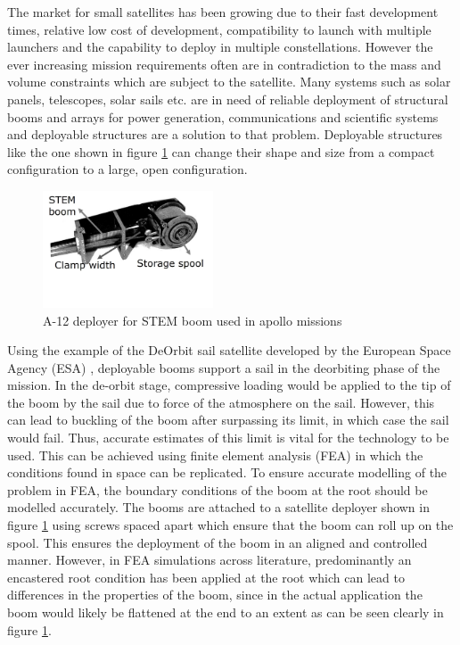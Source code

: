 The market for small satellites has been growing due to their fast development times, relative low cost of development, compatibility to launch with multiple launchers and the capability to deploy in multiple constellations. However the ever increasing mission requirements often are in contradiction to the mass and volume constraints which are subject to the satellite. Many systems such as solar panels, telescopes, solar sails etc. are in need of reliable deployment of structural booms and arrays for power generation, communications and scientific systems and deployable structures are a solution to that problem. Deployable structures like the one shown in figure \ref{fig:a12} can change their shape and size from a compact configuration to a large, open configuration. 
\begin{figure}
  \begin{center}
    \includegraphics[width=0.45\textwidth]{images/deployerboom.jpg}
  \end{center}
  \caption{A-12 deployer for STEM boom used in apollo missions \cite{NASA}}
  \label{fig:a12}
\end{figure}
Using the example of the DeOrbit sail satellite developed by the European Space Agency (ESA) \cite{ESA}, deployable booms support a sail in the deorbiting phase of the mission. In the de-orbit stage, compressive loading would be applied to the tip of the boom by the sail due to force of the atmosphere on the sail. However, this can lead to buckling of the boom after surpassing its limit, in which case the sail would fail. Thus, accurate estimates of this limit is vital for the technology to be used. This can be achieved using finite element analysis (FEA) in which the conditions found in space can be replicated. To ensure accurate modelling of the problem in FEA, the boundary conditions of the boom at the root should be modelled accurately. The booms are attached to a satellite deployer shown in figure \ref{fig:a12} using screws spaced apart which ensure that the boom can roll up on the spool. This ensures the deployment of the boom in an aligned and controlled manner. However, in FEA simulations across literature, predominantly an encastered root condition has been applied at the root which can lead to differences in the properties of the boom, since in the actual application the boom would likely be flattened at the end to an extent as can be seen clearly in figure \ref{fig:a12}. 

